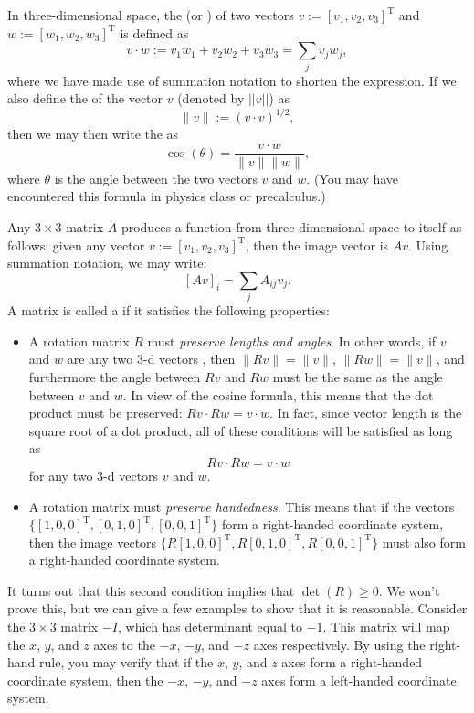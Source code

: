 In three-dimensional space, the  (or ) of two vectors $v:=[v_1,v_2,v_3]^{\text{T}}$ and $w:=[w_1,w_2,w_3]^{\text{T}}$ is defined as
\[ v \cdot w :=  v_1w_1 + v_2w_2 + v_3w_3 = \sum_j v_j w_j ,\]
where we have made use of summation notation to shorten the expression. If we also define the  of the vector $v$ (denoted by $||v||$) as
\[ \lVert v\rVert := (v \cdot v)^{1/2}, \]
then we may then write the  as
\[ \cos(\theta) = \frac{v \cdot w}{\lVert v \rVert \lVert w \rVert}, \]
where $\theta$ is the angle between the two vectors $v$ and $w$. (You may have encountered this formula in physics class or precalculus.)

Any $3 \times 3$ matrix $A$  produces a function from three-dimensional space to itself as follows: given any vector $v:=[v_1,v_2,v_3]^{\text{T}}$, then the image vector is $Av$. Using summation notation, we may write:
\[ [Av]_i = \sum_j A_{ij} v_j.\]
A matrix is called a  if it satisfies the following properties:
\begin{itemize}
\item
A rotation matrix $R$ must  \emph{preserve  lengths and angles}. In other words, if $v$ and $w$ are any two 3-d vectors , then  $\lVert Rv \rVert = \lVert v \rVert$,  $\lVert Rw \rVert = \lVert v \rVert$, and furthermore the angle between $Rv$ and $Rw$ must be the same as the angle between $v$ and $w$.  In view of the cosine formula, this means that the dot product must be preserved:  $Rv \cdot Rw = v \cdot w$. In fact, since vector length is the square root of a dot product, all of these conditions will be satisfied as long as 
\[ Rv \cdot Rw = v \cdot w \] 
for any two 3-d vectors $v$ and $w$.
\item
A rotation matrix must \emph{preserve handedness}. This means that if the vectors $\{ [1,0,0]^{\text{T}}, [0,1,0]^{\text{T}}, [0,0,1]^{\text{T}} \}$ form a right-handed coordinate system, then the image vectors 
$\{ R[1,0,0]^{\text{T}}, R[0,1,0]^{\text{T}}, R[0,0,1]^{\text{T}} \}$ must also form a right-handed coordinate system.  
\end{itemize}

It turns out that this second condition implies that $\det(R)\ge 0$. We won't prove this, but we can give a few examples to show that it is reasonable. Consider  the $3 \times 3$ matrix $-I$, which has determinant equal to $-1$. This matrix will map the $x$, $y$, and $z$ axes to the $-x$, $-y$, and $-z$ axes respectively. By using the right-hand rule, you may verify that if the $x$, $y$, and $z$ axes form a right-handed coordinate system, then the $-x$, $-y$, and $-z$ axes form a left-handed coordinate system.

